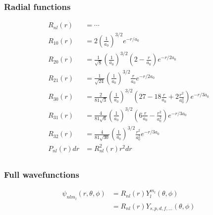 \subsubsection{Radial functions}
\begin{align*}
R_{nl}\left(r\right)&=\cdots\\
R_{10}\left(r\right)&=2\left( \frac{1}{a_0} \right)^{3/2}e^{-r/a_0}\\
R_{20}\left(r\right)&=\frac{1}{\sqrt{8}}  \left( \frac{1}{a_0} \right)^{3/2} \left( 2-\frac{r}{a_0} \right) e^{-r/2a_0}\\
R_{21}\left(r\right)&=\frac{1}{\sqrt{24}}  \left( \frac{1}{a_0} \right)^{3/2} \frac{r}{a_0} e^{-r/2a_0}\\
R_{30}\left(r\right)&=\frac{2}{81\sqrt{3}}  \left( \frac{1}{a_0} \right)^{3/2} \left( 27-18\frac{r}{a_0} +2\frac{r^2}{a_0^2}\right) e^{-r/3a_0}\\
R_{31}\left(r\right)&=\frac{4}{81\sqrt{6}}  \left( \frac{1}{a_0} \right)^{3/2} \left( 6\frac{r}{a_0} -\frac{r^2}{a_0^2}\right) e^{-r/3a_0}\\
R_{32}\left(r\right)&=\frac{4}{81\sqrt{30}}  \left( \frac{1}{a_0} \right)^{3/2} \frac{r^2}{a_0^2} e^{-r/3a_0}\\
P_{nl}\left(r\right)dr&=R^2_{nl}\left(r\right) r^2dr\\
\end{align*}
\subsubsection{Full wavefunctions}
\begin{align*}
\psi_{nlm_l}\left(r,\theta,\phi \right)&=R_{nl}\left(r\right)Y_l^{m_l}\left(\theta,\phi\right)\\
&=R_{nl}\left(r\right)Y_{s,p,d,f,\ldots}\left(\theta,\phi\right)\\
\end{align*}


